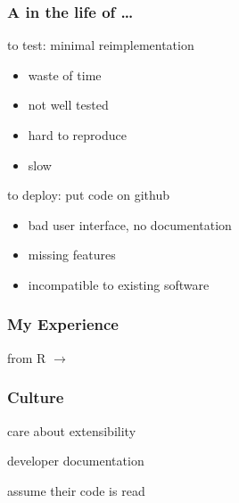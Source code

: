 \documentclass{beamer}
\newenvironment{wideitemize}{
    \itemize\addtolength{\itemsep}{15pt}\addtolength{\topsep}{10pt}}{\enditemize}
\begin{document}
    \begin{frame}
        \frametitle{A  in the life of \ldots}
        \vspace{0.8cm}
        \begin{wideitemize}
            \item<2-> to test: minimal reimplementation
            \begin{itemize}
                \item waste of time
                \item not well tested
                \item hard to reproduce
                \item slow
            \end{itemize}
            \item<3-> to deploy: put code on github
            \begin{itemize}
                \item bad user interface, no documentation
                \item missing features
                \item incompatible to existing software
            \end{itemize}
        \end{wideitemize}
    \end{frame}

    \begin{frame}
        \frametitle{My Experience}
        \vspace{1cm}
        \begin{wideitemize}
            \item from R $\to$ 
        \end{wideitemize}
    \end{frame}

    \begin{frame}
        \frametitle{Culture}
        \vspace{0.8cm}
        \begin{wideitemize}
            \item care about extensibility
            \item developer documentation
            \item assume their code is read
        \end{wideitemize}
    \end{frame}
\end{document}
